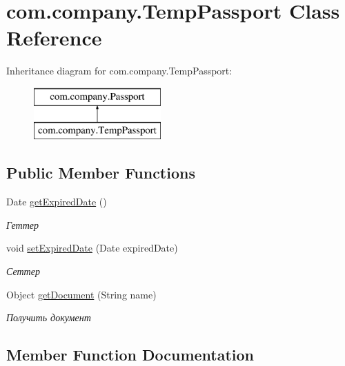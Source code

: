 \hypertarget{classcom_1_1company_1_1TempPassport}{}\section{com.\+company.\+Temp\+Passport Class Reference}
\label{classcom_1_1company_1_1TempPassport}
Inheritance diagram for com.\+company.\+Temp\+Passport\+:\begin{figure}[H]
\begin{center}
\leavevmode
\includegraphics[height=2.000000cm]{classcom_1_1company_1_1TempPassport}
\end{center}
\end{figure}
\subsection*{Public Member Functions}
\begin{DoxyCompactItemize}
\item 
Date \mbox{\hyperlink{classcom_1_1company_1_1TempPassport_ae25b090b629cf145991f4f66d4d0ba86}{get\+Expired\+Date}} ()
\begin{DoxyCompactList}\small\item\em Геттер \end{DoxyCompactList}\item 
void \mbox{\hyperlink{classcom_1_1company_1_1TempPassport_ae72565902824ef39a74e4eb60d31e95e}{set\+Expired\+Date}} (Date expired\+Date)
\begin{DoxyCompactList}\small\item\em Сеттер \end{DoxyCompactList}\item 
Object \mbox{\hyperlink{classcom_1_1company_1_1TempPassport_ae107b7b36e00f9e677c410339622b261}{get\+Document}} (String name)
\begin{DoxyCompactList}\small\item\em Получить документ \end{DoxyCompactList}\end{DoxyCompactItemize}


\subsection{Member Function Documentation}
\mbox{\label{classcom_1_1company_1_1TempPassport_ae107b7b36e00f9e677c410339622b261}} 

